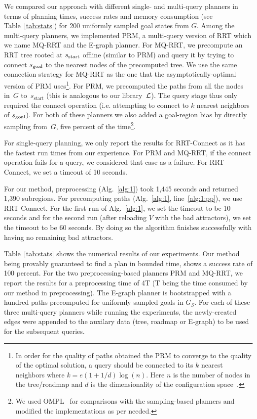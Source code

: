 \documentclass[a4paper]{report}
\begin{document}
We compared our approach with different single- and multi-query planners in terms of planning times, success rates and memory consumption (see Table~\ref{tab:stats}) for 200 uniformly sampled goal states from $G$. Among the multi-query planners, we implemented PRM, a multi-query version of RRT which we name MQ-RRT and the E-graph planner. 
For MQ-RRT, we precompute an RRT tree rooted at  $s_{\textrm{start}}$ offline (similar to PRM) and query it by trying to connect $s_{\text{goal}}$ to the nearest nodes of the precomputed tree. We use the same connection strategy for MQ-RRT as the one that the asymptotically-optimal version of PRM uses\footnote{In order for the quality of paths obtained the PRM to converge to the quality of the optimal solution, a query should be connected to its $k$ nearest neighbors where 
$k = e(1+1/d)\log(n)$.
Here $n$ is the number of nodes in the tree/roadmap and $d$ is the dimensionality of the configuration space~\cite{karaman2011sampling,SSH16}. 
}.
For PRM, we precomputed the paths from all the nodes in~$G$ to~$s_{\text{start}}$ (this is analogous to our library~$\mathcal{L}$). 
The query stage thus only required the connect operation (i.e. attempting to connect to $k$ nearest neighbors of $s_{\text{goal}}$). For both of these planners we also added a goal-region bias by directly sampling from~$G$, five percent of the time\footnote{We used OMPL~\cite{SMK12} for comparisons with the sampling-based planners and modified the implementations as per needed.}. 

For single-query planning, we only report the results for RRT-Connect as it has the fastest run times from our experience. For PRM and MQ-RRT, if the connect operation fails for a query, we considered that case as a failure. For RRT-Connect, we set a timeout of 10 seconds.

For our method, preprocessing (Alg.~\ref{alg:1}) took 1,445 seconds and returned 1,390 subregions. For precomputing paths (Alg.~\ref{alg:1}, line~\ref{alg:1:pp}), we use RRT-Connect. For the first run of Alg.~\ref{alg:1}, we set the timeout to be 10 seconds and for the second run (after reloading $V$ with the bad attractors), we set the timeout to be 60 seconds. By doing so the algorithm finishes successfully with having no remaining bad attractors.

Table~\ref{tab:stats} shows the numerical results of our experiments. Our method being provably guaranteed to find a plan in bounded time, shows a success rate of 100 percent. For the two preprocessing-based planners PRM and MQ-RRT, we report the results for a preprocessing time of 4T (T being the time consumed by our method in preprocessing). The E-graph planner is bootstrapped with a hundred paths precomputed for uniformly sampled goals in $G_S$. For each of these three multi-query planners while running the experiments, the newly-created edges were appended to the auxilary data (tree, roadmap or E-graph) to be used for the subsequent queries.
\end{document}
